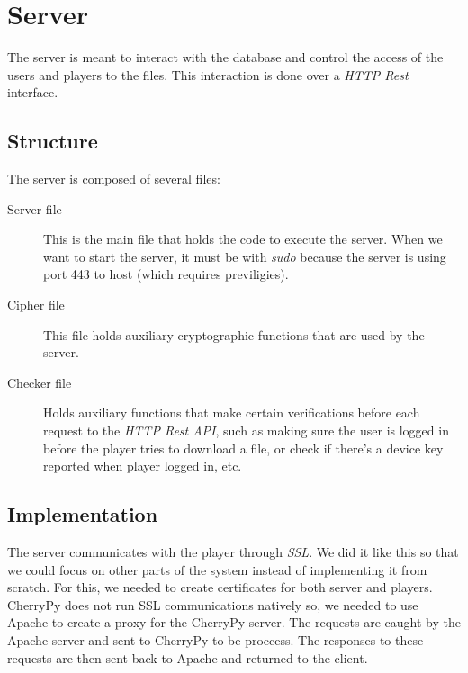 \documentclass[11pt,a4paper]{report}
\begin{document}
\section{Server}
The server is meant to interact with the database and control the access of the users and players to the files.
This interaction is done over a \emph{HTTP Rest} interface.
 
\subsection{Structure}
The server is composed of several files:

\begin{description}
  \item[Server file] This is the main file that holds the code to execute the server. When we want to start the server, it must be with \emph{sudo} because the server is using port 443 to host (which requires previligies).
  \item[Cipher file] This file holds auxiliary cryptographic functions that are used by the server.
  \item[Checker file] Holds auxiliary functions that make certain verifications before each request to the \emph{HTTP Rest API}, such as making sure the user is logged in before the player tries to download a file, or check if there's a device key reported when player logged in, etc.
\end{description}

\subsection{Implementation}
The server communicates with the player through \emph{SSL}. We did it like this so that we could focus on other parts of the system instead of implementing it from scratch.
For this, we needed to create certificates for both server and players.
\newline CherryPy does not run SSL communications natively so, we needed to use Apache to create a proxy for the CherryPy server. The requests are caught by the Apache server and sent to CherryPy to be proccess. The responses to these requests are then sent back to Apache and returned to the client.
\end{document}
